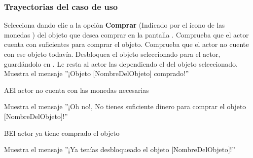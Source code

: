 \subsubsection{Trayectorias del caso de uso}

\begin{UCtrayectoria}%
%

    \Actor Selecciona dando clic a la opción \textbf{Comprar} (Indicado por el ícono de las monedas \IUMonedas{}) del objeto que desea comprar en la pantalla .
    \Sistema Comprueba que el actor cuenta con suficientes  para comprar el objeto. 
    \Sistema Comprueba que el actor no cuente con ese objeto todavía. 
    \Sistema Desbloquea el objeto seleccionado para el actor, guardándolo en .
    \Sistema Le resta al actor las  dependiendo el  del objeto seleccionado.
    \Sistema Muestra el mensaje ''¡Objeto [NombreDelObjeto] comprado!''%

\end{UCtrayectoria}

\begin{UCtrayectoriaA}%
  {A}{El actor no cuenta con las monedas necesarias }

  \Sistema Muestra el mensaje  ''¡Oh no!, No tienes suficiente dinero para comprar el objeto [NombreDelObjeto]!''%

\end{UCtrayectoriaA}

\begin{UCtrayectoriaA}%
{B}{El actor ya tiene comprado el objeto}

    \Sistema Muestra el mensaje ''¡Ya tenías desbloqueado el objeto [NombreDelObjeto]!''%

\end{UCtrayectoriaA}
